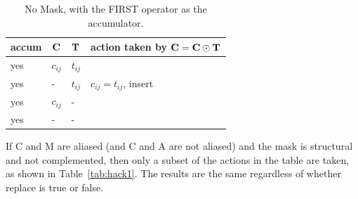 \begin{table}[h]
\begin{center}
{\small
\begin{tabular}{lll|l}
\hline
       accum & ${\bf C}$ & ${\bf T}$        & action taken by ${\bf C = C \odot T}$ \\
\hline
        yes & $c_{ij}$ & $t_{ij}$         &  \\
        yes &  -       & $t_{ij}$         &  $c_{ij} = t_{ij}$, insert \\
        yes & $c_{ij}$ &  -               &   \\
        yes &  -       &  -               &   \\
\hline
\end{tabular}
}
\caption{No Mask, with the FIRST operator as the accumulator.
\label{tab:maskaccum_nomask_1st}}
\end{center}
\end{table}


\newpage
If C and M are aliased (and C and A are not aliased) and the mask is structural
and not complemented, then only a subset of the actions in the table are taken,
as shown in Table~\ref{tab:hack1}.  The results are the same regardless of
whether replace is true or false.  

